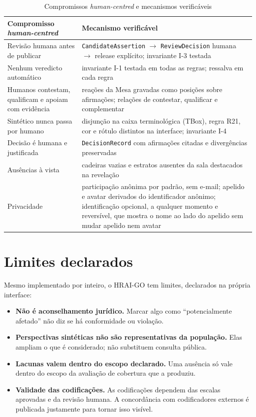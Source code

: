 \documentclass[12pt,a4paper,oneside,english,brazil]{abntex2}
\begin{document}
\begin{table}[htb]
\caption{Compromissos \emph{human-centred} e mecanismos verificáveis}\label{tab:h}
\small
\begin{tabularx}{\linewidth}{>{\raggedright\arraybackslash}p{48mm} L}
\toprule
Compromisso \emph{human-centred} & Mecanismo verificável\\
\midrule
Revisão humana antes de publicar & \texttt{CandidateAssertion} $\to$ \texttt{ReviewDecision} humana $\to$ release explícito; invariante I-3 testada\\
Nenhum veredicto automático & invariante I-1 testada em todas as regras; ressalva em cada regra\\
Humanos contestam, qualificam e apoiam com evidência & reações da Mesa gravadas como posições sobre afirmações; relações de contestar, qualificar e complementar\\
Sintético nunca passa por humano & disjunção na caixa terminológica (TBox), regra R21, cor e rótulo distintos na interface; invariante I-4\\
Decisão é humana e justificada & \texttt{DecisionRecord} com afirmações citadas e divergências preservadas\\
Ausências à vista & cadeiras vazias e estratos ausentes da sala destacados na revelação\\
Privacidade & participação anônima por padrão, sem e-mail; apelido e avatar derivados do identificador anônimo; identificação opcional, a qualquer momento e reversível, que mostra o nome ao lado do apelido sem mudar apelido nem avatar\\
\bottomrule
\end{tabularx}
\end{table}

\chapter{Limites declarados}\label{cap:limites}
Mesmo implementado por inteiro, o HRAI-GO tem limites, declarados na própria interface:
\begin{itemize}[leftmargin=*]
  \item \textbf{Não é aconselhamento jurídico.} Marcar algo como ``potencialmente afetado'' não diz se há conformidade ou violação.
  \item \textbf{Perspectivas sintéticas não são representativas da população.} Elas ampliam o que é considerado; não substituem consulta pública.
  \item \textbf{Lacunas valem dentro do escopo declarado.} Uma ausência só vale dentro do escopo da avaliação de cobertura que a produziu.
  \item \textbf{Validade das codificações.} As codificações dependem das escalas aprovadas e da revisão humana. A concordância com codificadores externos é publicada justamente para tornar isso visível.
\end{itemize}
\end{document}
